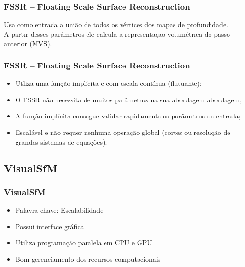 \documentclass[table, usenames, svgnames, xcolor=dvipsnames]{beamer}
\begin{document}
\begin{frame}
\frametitle{\textbf{FSSR -- Floating Scale Surface Reconstruction}}
	\begin{center}
	Usa como entrada a união de todos os vértices dos mapas de profundidade. \\
	A partir desses parâmetros ele calcula a representação volumétrica do passo anterior (MVS).
	\end{center}
\end{frame}

\begin{frame}
\frametitle{\textbf{FSSR -- Floating Scale Surface Reconstruction}}
	\begin{center}
		\begin{itemize}
			\item {Utliza uma função implícita e com escala contínua (flutuante);}
			\item {O FSSR não necessita de muitos parâmetros na sua abordagem abordagem;}
			\item {A função implícita consegue validar rapidamente os parâmetros de entrada;}
			\item {Escalável e não requer nenhuma operação global (cortes ou resolução de grandes sistemas de equações).}
		\end{itemize}
	\end{center}	  
\end{frame}
%

\subsection{VisualSfM}

\begin{frame} 
\frametitle{\textbf{VisualSfM}}
	\begin{center}
		\begin{itemize}
			\item {Palavra-chave: Escalabilidade}
			\item {Possui interface gráfica}
			\item {Utiliza programação paralela em CPU e GPU}
			\item {Bom gerenciamento dos recursos computacionais}
		\end{itemize}
	\end{center}
\end{frame}
\end{document}
